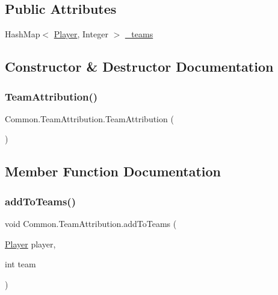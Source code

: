 \subsection*{Public Attributes}
\begin{DoxyCompactItemize}
\item 
Hash\+Map$<$ \mbox{\hyperlink{classCommon_1_1Player}{Player}}, Integer $>$ \mbox{\hyperlink{classCommon_1_1TeamAttribution_abfb1f1db66ae40b6030fba06a65b88d8}{\+\_\+teams}}
\end{DoxyCompactItemize}


\subsection{Constructor \& Destructor Documentation}
\mbox{\label{classCommon_1_1TeamAttribution_ae9e3f8d680bd877d243b2bd1261e915f}} 
\subsubsection{\texorpdfstring{Team\+Attribution()}{TeamAttribution()}}
{\footnotesize\ttfamily Common.\+Team\+Attribution.\+Team\+Attribution (\begin{DoxyParamCaption}{ }\end{DoxyParamCaption})\hspace{0.3cm}{\ttfamily [inline]}}



\subsection{Member Function Documentation}
\mbox{\label{classCommon_1_1TeamAttribution_aa21f38f5bb27527934d518ea68120f56}} 
\subsubsection{\texorpdfstring{add\+To\+Teams()}{addToTeams()}}
{\footnotesize\ttfamily void Common.\+Team\+Attribution.\+add\+To\+Teams (\begin{DoxyParamCaption}\item[{\mbox{\hyperlink{classCommon_1_1Player}{Player}}}]{player,  }\item[{int}]{team }\end{DoxyParamCaption})\hspace{0.3cm}{\ttfamily [inline]}}

